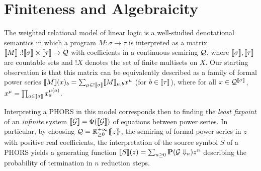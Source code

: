 \documentclass{easychair}
\begin{document}
%






\section{Finiteness and Algebraicity}



%
The weighted relational model of linear logic is a well-studied denotational semantics in which a program $M:\sigma\to\tau$ is interpreted as a matrix $\llbracket M\rrbracket:!\llbracket\sigma\rrbracket\times\llbracket\tau\rrbracket\to \mathcal{Q}$ with coefficients in a continuous semiring $\mathcal{Q}$, where $\llbracket\sigma\rrbracket,\llbracket\tau\rrbracket$ are countable sets and $!X$ denotes the set of finite multisets on $X$. Our starting observation is that this matrix can be equivalently described as a family of formal power series $\llbracket M\rrbracket( x)_b= \sum_{\mu\in !\llbracket\sigma\rrbracket}\llbracket M\rrbracket_{\mu,b}x^{\mu}$ (for $b\in \llbracket\tau\rrbracket$), where for all $x\in \mathcal{Q}^{\llbracket\sigma\rrbracket}$, $x^\mu=\prod_{a\in \llbracket\sigma\rrbracket}x_a^{\mu(a)}$.


Interpreting a PHORS in this model corresponds then to finding the \emph{least fixpoint} of an \emph{infinite} system $\llbracket\mathcal{G}\rrbracket = \Phi(\llbracket\mathcal{G}\rrbracket)$ of equations between power series.
In particular, by choosing $\mathcal{Q}={\mathbb{R}^{+\infty}_{\geq 0}}\{\!\!\{z\}\!\!\}$, the semiring of formal power series in $z$ with positive real coefficients, 
the interpretation of the source symbol $S$ of a PHORS yields a generating function
$\llbracket S\rrbracket(z)= \sum_{n \geq 0} \mathbf{P}(\mathcal{G} \Downarrow_n)z^n$ describing the 
probability of termination in $n$ reduction steps.
\end{document}
